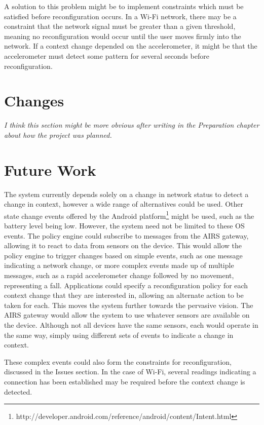 \documentclass[12pt,twoside,notitlepage]{report}
\begin{document}
A solution to this problem might be to implement constraints which must be satisfied before reconfiguration occurs. 
In a Wi-Fi network, there may be a constraint that the network signal must be greater than a given threshold, meaning no reconfiguration would occur until the user moves firmly into the network. 
If a context change depended on the accelerometer, it might be that the accelerometer must detect some pattern for several seconds before reconfiguration.

\section{Changes}
{\sl I think this section might be more obvious after writing in the Preparation chapter about how the project was planned. }


\section{Future Work}

The system currently depends solely on a change in network status to detect a change in context, however a wide range of alternatives could be used. 
Other state change events offered by the Android platform\footnote{http://developer.android.com/reference/android/content/Intent.html} might be used, such as the battery level being low. 
However, the system need not be limited to these OS events. 
The policy engine could subscribe to messages from the AIRS gateway, allowing it to react to data from sensors on the device. 
This would allow the policy engine to trigger changes based on simple events, such as one message indicating a network change, or more complex events made up of multiple messages, such as a rapid accelerometer change followed by no movement, representing a fall. 
Applications could specify a reconfiguration policy for each context change that they are interested in, allowing an alternate action to be taken for each. 
This moves the system further towards the pervasive vision. 
The AIRS gateway would allow the system to use whatever sensors are available on the device. 
Although not all devices have the same sensors, each would operate in the same way, simply using different sets of events to indicate a change in context.

These complex events could also form the constraints for reconfiguration, discussed in the Issues section. 
In the case of Wi-Fi, several readings indicating a connection has been established may be required before the context change is detected. 
\end{document}
